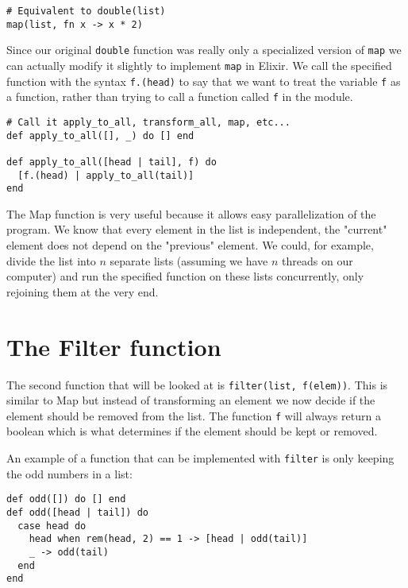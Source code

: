 \documentclass[a4paper,11pt]{article}
\begin{document}
\begin{verbatim}
# Equivalent to double(list)
map(list, fn x -> x * 2)
\end{verbatim}

Since our original \texttt{double} function was really only a specialized version of \texttt{map} we can actually modify it slightly to implement \texttt{map} in Elixir.
We call the specified function with the syntax \texttt{f.(head)} to say that we want to treat the variable \texttt{f} as a function, rather than trying to call a function called \texttt{f} in the module.

\begin{verbatim}
# Call it apply_to_all, transform_all, map, etc...
def apply_to_all([], _) do [] end

def apply_to_all([head | tail], f) do
  [f.(head) | apply_to_all(tail)]
end
\end{verbatim}

The Map function is very useful because it allows easy parallelization of the program.
We know that every element in the list is independent, the "current" element does not depend on the "previous" element.
We could, for example, divide the list into $n$ separate lists (assuming we have $n$ threads on our computer) and run the specified function on these lists concurrently, only rejoining them at the very end.

\section*{The Filter function}

The second function that will be looked at is \texttt{filter(list, f(elem))}.
This is similar to Map but instead of transforming an element we now decide if the element should be removed from the list.
The function \texttt{f} will always return a boolean which is what determines if the element should be kept or removed.

An example of a function that can be implemented with \texttt{filter} is only keeping the odd numbers in a list:

\begin{verbatim}
def odd([]) do [] end
def odd([head | tail]) do
  case head do
    head when rem(head, 2) == 1 -> [head | odd(tail)]
    _ -> odd(tail)
  end
end
\end{verbatim}
\end{document}
